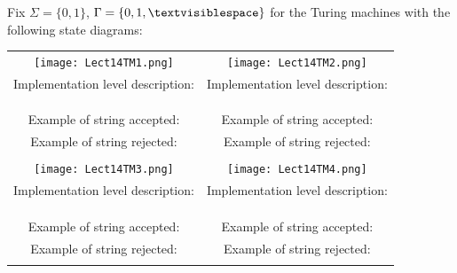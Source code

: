 \documentclass[12pt, oneside]{article}
\begin{document}
  
  Fix $\Sigma = \{0,1\}$, $\Gamma = \{ 0, 1, \textvisiblespace\}$ for the Turing machines with  the following state diagrams:
  
  \begin{center}
  \begin{tabular}{|c|c|}
  \hline
  \hspace{0.8in}\texttt{[image: Lect14TM1.png]} \phantom{\hspace{0.8in}}&\hspace{0.8in} \texttt{[image: Lect14TM2.png]} \phantom{\hspace{0.8in}}\\
  Implementation  level description:  \phantom{\hspace{1in}} &Implementation  level description:  \phantom{\hspace{1in}} \\
  &\\
  &\\
  &\\
  Example of string accepted: \phantom{\hspace{1.5in}}& Example of string accepted: \phantom{\hspace{1.5in}}\\
  Example of string rejected: \phantom{\hspace{1.5in}}& Example of string  rejected: \phantom{\hspace{1.5in}}\\
  & \\
  \hline
  \texttt{[image: Lect14TM3.png]} & \texttt{[image: Lect14TM4.png]} \\
  Implementation  level description:  \phantom{\hspace{1in}} &Implementation  level description:  \phantom{\hspace{1in}} \\
  &\\
  &\\
  &\\
  Example of string accepted: \phantom{\hspace{1.5in}}& Example of string accepted: \phantom{\hspace{1.5in}}\\
  Example of string rejected: \phantom{\hspace{1.5in}}& Example of string  rejected: \phantom{\hspace{1.5in}}\\
  & \\
  
  \hline
  \end{tabular}
  \end{center}
\end{document}

